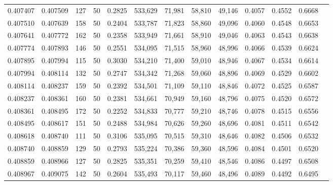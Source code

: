 \begin{tabular}{rrrrrrrrrrrrr}
0.407407 & 0.407509 &   127 &  50 &                                     0.2825 & 533,629 &  71,981 &  58,810 &  49,146 & 0.4057 & 0.4552 & 0.6668 \\
0.407510 & 0.407639 &   158 &  50 &                                     0.2404 & 533,787 &  71,823 &  58,860 &  49,096 & 0.4060 & 0.4548 & 0.6653 \\
0.407641 & 0.407772 &   162 &  50 &                                     0.2358 & 533,949 &  71,661 &  58,910 &  49,046 & 0.4063 & 0.4543 & 0.6638 \\
0.407774 & 0.407893 &   146 &  50 &                                     0.2551 & 534,095 &  71,515 &  58,960 &  48,996 & 0.4066 & 0.4539 & 0.6624 \\
0.407895 & 0.407994 &   115 &  50 &                                     0.3030 & 534,210 &  71,400 &  59,010 &  48,946 & 0.4067 & 0.4534 & 0.6614 \\
0.407994 & 0.408114 &   132 &  50 &                                     0.2747 & 534,342 &  71,268 &  59,060 &  48,896 & 0.4069 & 0.4529 & 0.6602 \\
0.408114 & 0.408237 &   159 &  50 &                                     0.2392 & 534,501 &  71,109 &  59,110 &  48,846 & 0.4072 & 0.4525 & 0.6587 \\
0.408237 & 0.408361 &   160 &  50 &                                     0.2381 & 534,661 &  70,949 &  59,160 &  48,796 & 0.4075 & 0.4520 & 0.6572 \\
0.408361 & 0.408495 &   172 &  50 &                                     0.2252 & 534,833 &  70,777 &  59,210 &  48,746 & 0.4078 & 0.4515 & 0.6556 \\
0.408495 & 0.408617 &   151 &  50 &                                     0.2488 & 534,984 &  70,626 &  59,260 &  48,696 & 0.4081 & 0.4511 & 0.6542 \\
0.408618 & 0.408740 &   111 &  50 &                                     0.3106 & 535,095 &  70,515 &  59,310 &  48,646 & 0.4082 & 0.4506 & 0.6532 \\
0.408740 & 0.408859 &   129 &  50 &                                     0.2793 & 535,224 &  70,386 &  59,360 &  48,596 & 0.4084 & 0.4501 & 0.6520 \\
0.408859 & 0.408966 &   127 &  50 &                                     0.2825 & 535,351 &  70,259 &  59,410 &  48,546 & 0.4086 & 0.4497 & 0.6508 \\
0.408967 & 0.409075 &   142 &  50 &                                     0.2604 & 535,493 &  70,117 &  59,460 &  48,496 & 0.4089 & 0.4492 & 0.6495 \\

\end{tabular}
